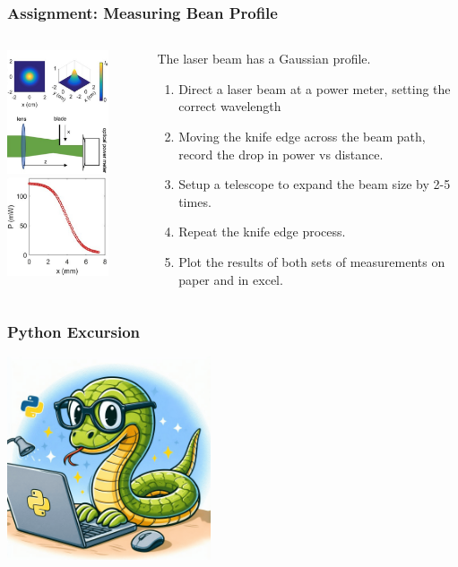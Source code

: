 \documentclass{beamer}
\begin{document}
\begin{frame}\frametitle{Assignment: Measuring Bean Profile}
\begin{columns}
\begin{column}{4cm}
\begin{center}
\includegraphics[width=3cm]{fig/profile1.jpg}
\includegraphics[width=3cm]{fig/profile2.jpg}
\end{center}
\end{column}
\begin{column}{7cm}
The laser beam has a Gaussian profile.
\begin{enumerate}
\item Direct a laser beam at a power meter, setting the correct wavelength
\item Moving the knife edge across the beam path, record the drop in power vs distance.
\item Setup a telescope to expand the beam size by 2-5 times.
\item Repeat the knife edge process.
\item Plot the results of both sets of measurements on paper and in excel.
\end{enumerate}
\end{column}
\end{columns}
\end{frame}

\begin{frame}\frametitle{Python Excursion}

\begin{center}
\includegraphics[width=6cm]{fig/python1.png}
\end{center}

\end{frame}
\end{document}
